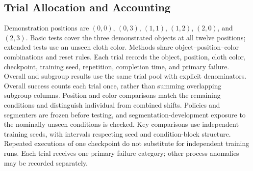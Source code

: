 \subsection{Trial Allocation and Accounting}
Demonstration positions are $(0,0)$, $(0,3)$, $(1,1)$, $(1,2)$, $(2,0)$, and $(2,3)$.
Basic tests cover the three demonstrated objects at all twelve positions; extended tests use an unseen cloth color.
Methods share object--position--color combinations and reset rules.
Each trial records the object, position, cloth color, checkpoint, training seed, repetition, completion time, and primary failure.
Overall and subgroup results use the same trial pool with explicit denominators.
Overall success counts each trial once, rather than summing overlapping subgroup columns.
Position and color comparisons match the remaining conditions and distinguish individual from combined shifts.
Policies and segmenters are frozen before testing, and segmentation-development exposure to the nominally unseen conditions is checked.
Key comparisons use independent training seeds, with intervals respecting seed and condition-block structure.
Repeated executions of one checkpoint do not substitute for independent training runs.
Each trial receives one primary failure category; other process anomalies may be recorded separately.

